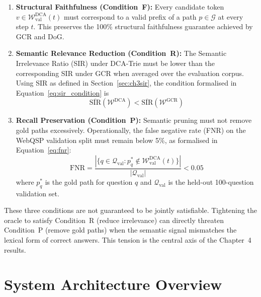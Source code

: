 \begin{enumerate}
  \item \textbf{Structural Faithfulness (Condition~F):} Every candidate token $v \in \mathcal{W}_{\text{val}}^{\text{DCA}}(t)$ must correspond to a valid prefix of a path $p \in \mathcal{G}$ at every step $t$. This preserves the 100\% structural faithfulness guarantee achieved by GCR and DoG.

  \item \textbf{Semantic Relevance Reduction (Condition~R):} The Semantic Irrelevance Ratio (SIR) under DCA-Trie must be lower than the corresponding SIR under GCR when averaged over the evaluation corpus. Using SIR as defined in Section~\ref{sec:ch3sir}, the condition formalised in Equation~\eqref{eq:sir_condition} is
        \begin{equation}
          \overline{\text{SIR}}\!\left(\mathcal{W}^{\text{DCA}}\right) <
          \overline{\text{SIR}}\!\left(\mathcal{W}^{\text{GCR}}\right)
          \label{eq:sir_condition}
        \end{equation}

  \item \textbf{Recall Preservation (Condition~P):} Semantic pruning must not remove gold paths excessively. Operationally, the false negative rate (FNR) on the WebQSP validation split must remain below 5\%, as formalised in Equation~\eqref{eq:fnr}:
        \begin{equation}
          \text{FNR} = \frac{|\{q \in \mathcal{Q}_{\text{val}} :
            p^*_q \notin \mathcal{W}_{\text{val}}^{\text{DCA}}(t)\}|}{|\mathcal{Q}_{\text{val}}|}
          < 0.05
          \label{eq:fnr}
        \end{equation}
        where $p^*_q$ is the gold path for question $q$ and $\mathcal{Q}_{\text{val}}$ is the held-out 100-question validation set.
\end{enumerate}

These three conditions are not guaranteed to be jointly satisfiable. Tightening the oracle to satisfy Condition~R (reduce irrelevance) can directly threaten Condition~P (remove gold paths) when the semantic signal mismatches the lexical form of correct answers. This tension is the central axis of the Chapter~4 results.


\section{System Architecture Overview}
\label{sec:ch3arch}

